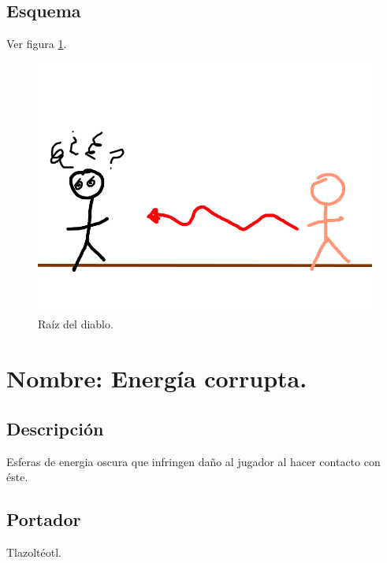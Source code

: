 \subsection{Esquema}
			Ver figura \ref{fig:raiz}.
			\begin{figure}
				\centering
				\includegraphics[height=0.2 \textheight]{Imagenes/raiz}
				\caption{Raíz del diablo.}
				\label{fig:raiz}
			\end{figure}

\section{Nombre: Energía corrupta.} \label{hab.CorrupEner}
\subsection{Descripción}
Esferas de energia oscura que infringen daño al jugador al hacer contacto con éste.
\subsection{Portador}
Tlazoltéotl.
